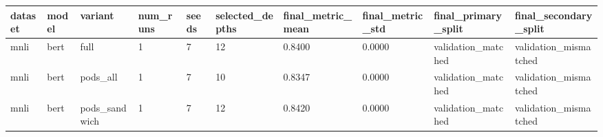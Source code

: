 \begin{tabular}{llllllllll}
\hline
dataset & model & variant & num\_runs & seeds & selected\_depths & final\_metric\_mean & final\_metric\_std & final\_primary\_split & final\_secondary\_split \\
\hline
mnli & bert & full & 1 & 7 & 12 & 0.8400 & 0.0000 & validation\_matched & validation\_mismatched \\
mnli & bert & pods\_all & 1 & 7 & 10 & 0.8347 & 0.0000 & validation\_matched & validation\_mismatched \\
mnli & bert & pods\_sandwich & 1 & 7 & 12 & 0.8420 & 0.0000 & validation\_matched & validation\_mismatched \\
\hline
\end{tabular}
